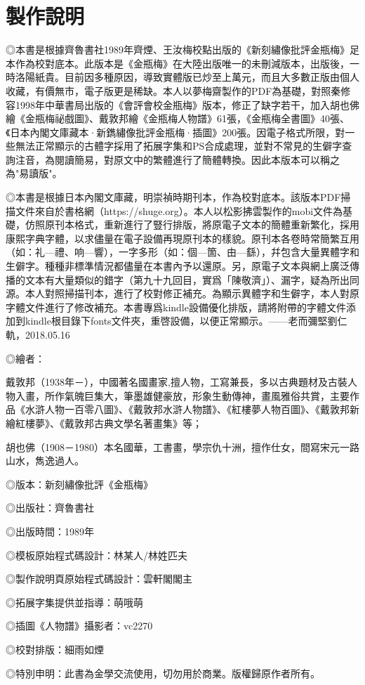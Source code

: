 \chapter*{製作說明}


◎本書是根據齊魯書社1989年齊煙、王汝梅校點出版的《新刻繡像批評金瓶梅》足本作為校對底本。此版本是《金瓶梅》在大陸出版唯一的未刪減版本，出版後，一時洛陽紙貴。目前因多種原因，導致實體版已炒至上萬元，而且大多數正版由個人收藏，有價無市，電子版更是稀缺。本人以夢梅齋製作的PDF為基礎，對照秦修容1998年中華書局出版的《會評會校金瓶梅》版本，修正了缺字若干，加入胡也佛繪《金瓶梅祕戲圖》、戴敦邦繪《金瓶梅人物譜》61張，《金瓶梅全書圖》40張、《日本內閣文庫藏本·新鐫繡像批評金瓶梅·插圖》200張。因電子格式所限，對一些無法正常顯示的古體字採用了拓展字集和PS合成處理，並對不常見的生僻字查詢注音，為閱讀簡易，對原文中的繁體進行了簡體轉換。因此本版本可以稱之為"易讀版"。

   ◎本書是根據日本內閣文庫藏，明崇禎時期刊本，作為校對底本。該版本PDF掃描文件來自於書格網（https://shuge.org）。本人以松影拂雲製作的mobi文件為基礎，仿照原刊本格式，重新進行了豎行排版，將原電子文本的簡體重新繁化，採用康熙字典字體，以求儘量在電子設備再現原刊本的樣貌。原刊本各卷時常簡繁互用（如：礼—禮、响—響），一字多形（如：個—箇、由—繇），幷包含大量異體字和生僻字。種種非標準情況都儘量在本書內予以還原。另，原電子文本與網上廣泛傳播的文本有大量類似的錯字（第九十九回目，實爲「陳敬濟」）、漏字，疑為所出同源。本人對照掃描刊本，進行了校對修正補充。為顯示異體字和生僻字，本人對原字體文件進行了修改補充。本書專爲kindle設備優化排版，請將附帶的字體文件添加到kindle根目錄下fonts文件夾，重啓設備，以便正常顯示。——老而彌堅劉仁軌，2018.05.16 

◎繪者：

戴敦邦（1938年－），中國著名國畫家,擅人物，工寫兼長，多以古典題材及古裝人物入畫，所作氣魄巨集大，筆墨雄健豪放，形象生動傳神，畫風雅俗共賞，主要作品《水滸人物一百零八圖》、《戴敦邦水滸人物譜》、《紅樓夢人物百圖》、《戴敦邦新繪紅樓夢》、《戴敦邦古典文學名著畫集》等；

胡也佛（1908－1980）本名國華，工書畫，學宗仇十洲，擅作仕女，間寫宋元一路山水，雋逸過人。

◎版本：新刻繡像批評《金瓶梅》

◎出版社：齊魯書社

◎出版時間：1989年

◎模板原始程式碼設計：林某人/林姓匹夫

◎製作說明頁原始程式碼設計：雲軒閣閣主

◎拓展字集提供並指導：萌哦萌

◎插圖《人物譜》攝影者：vc2270

◎校對排版：細雨如煙

◎特別申明：此書為金學交流使用，切勿用於商業。版權歸原作者所有。

